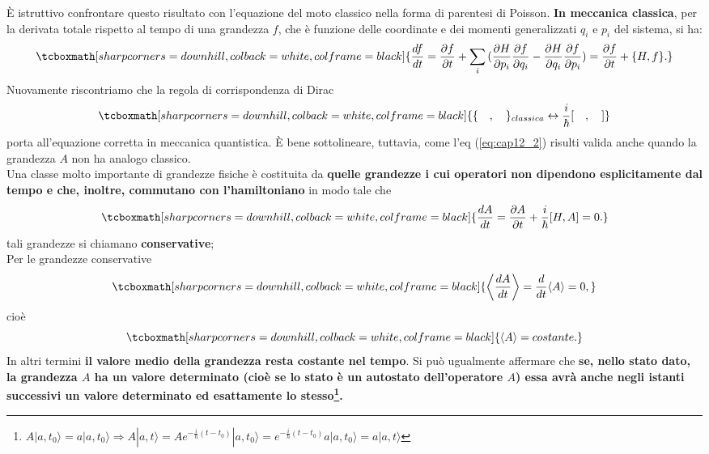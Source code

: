 \documentclass[a4paper,12pt,oneside]{book}
\begin{document}
È istruttivo confrontare questo risultato con l'equazione del moto classico nella forma di parentesi di Poisson. \textbf{In meccanica classica}, per la derivata totale rispetto al tempo di una grandezza $f$, che è funzione delle coordinate e dei momenti generalizzati $q_i$ e $p_i$ del sistema, si ha:
	\begin{equation}
		\tcboxmath[sharp corners=downhill, colback=white, colframe=black]{
			\frac{df}{dt}= \frac{\partial f}{\partial{t}} + \sum_{i}^{}{(\frac{\partial H}{\partial{p_i}}\frac{\partial f}{\partial{q_i}} - \frac{\partial H}{\partial{q_i}}\frac{\partial f}{\partial{p_i}}} )=
\frac{\partial f}{\partial{t}}+ \{H,f\}.
			}
	\end{equation}
Nuovamente riscontriamo che la regola di corrispondenza di Dirac 
	\begin{equation}
		\tcboxmath[sharp corners=downhill, colback=white, colframe=black]{
			\{ \quad,\quad   \}_{classica}  \leftrightarrow \frac{i}{\hbar} [ \quad, \quad]
			}
	\end{equation}
porta all'equazione corretta in meccanica quantistica. È bene sottolineare, tuttavia, come l'eq (\ref{eq:cap12_2}) risulti valida anche quando la grandezza $A$ non ha analogo classico.\\

Una classe molto importante di grandezze fisiche è costituita da \textbf{quelle grandezze i cui operatori non dipendono esplicitamente dal tempo e che, inoltre, commutano con l'hamiltoniano} in modo tale che 
	\begin{equation}
		\tcboxmath[sharp corners=downhill, colback=white, colframe=black]{
			\frac{dA}{dt}= \frac{\partial A}{\partial{t}} + \frac{i}{\hbar}[H,A]=0.
			}
	\end{equation}
tali grandezze si chiamano \textbf{conservative};\\

Per le grandezze conservative 
	\begin{equation} 
		\tcboxmath[sharp corners=downhill, colback=white, colframe=black]{
			\left\langle \frac{dA}{dt}\right\rangle= \frac{d}{dt}\langle A \rangle =0,
			}
	\end{equation}
cioè 
	\begin{equation}
		\tcboxmath[sharp corners=downhill, colback=white, colframe=black]{
			\langle A \rangle= costante.
			}
	\end{equation}
In altri termini \textbf{il valore medio della grandezza resta costante nel tempo}. Si può ugualmente affermare che \textbf{se, nello stato dato, la grandezza $A$ ha un valore determinato (cioè se lo stato è un autostato dell'operatore $A$) essa avrà anche negli istanti successivi un valore determinato ed esattamente lo stesso\footnote{$A| a, t_0\rangle= a |a,t_0\rangle \Rightarrow A|a, t \rangle = Ae^{-\frac{i}{\hbar}(t-t_0)}|a,t_0\rangle=e^{-\frac{i}{\hbar}(t-t_0)}a|a,t_0\rangle=a|a,t\rangle$}.}\\
\end{document}
